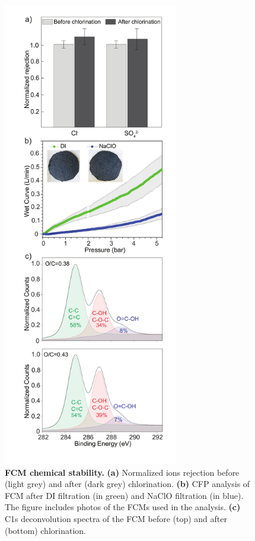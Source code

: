 \begin{figure}%
  \centering
  \includegraphics[width=3in]{paper5/Fig3.pdf}
  \caption{\textbf{FCM chemical stability.} \textbf{(a)} Normalized ions rejection before (light grey) and after (dark grey) chlorination. \textbf{(b)} CFP analysis of FCM after DI filtration (in green) and NaClO filtration (in blue). The figure includes photos of the FCMs used in the analysis. \textbf{(c)} C1s deconvolution spectra of the FCM before (top) and after (bottom) chlorination.}
  \label{Fig3_pap5}
\end{figure}

